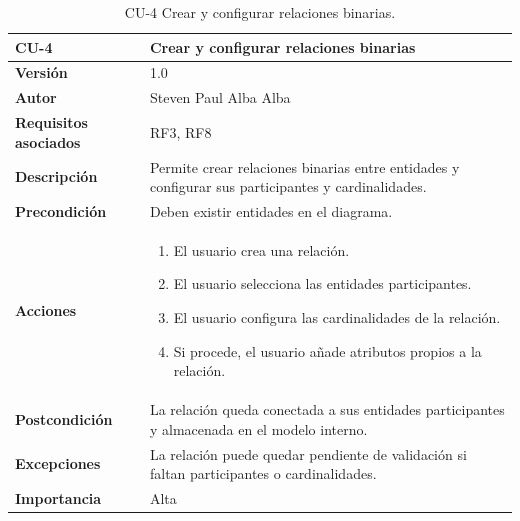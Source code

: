 \begin{table}[p]
\centering
\begin{tabularx}{\linewidth}{ p{} p{} }
\toprule
\textbf{CU-4} & \textbf{Crear y configurar relaciones binarias}\\
\toprule
\textbf{Versión} & 1.0 \\
\textbf{Autor} & Steven Paul Alba Alba \\
\textbf{Requisitos asociados} & RF3, RF8 \\
\textbf{Descripción} & Permite crear relaciones binarias entre entidades y configurar sus participantes y cardinalidades. \\
\textbf{Precondición} & Deben existir entidades en el diagrama. \\
\textbf{Acciones} &
\begin{enumerate}
\def\labelenumi{\arabic{enumi}.}
\tightlist
\item El usuario crea una relación.
\item El usuario selecciona las entidades participantes.
\item El usuario configura las cardinalidades de la relación.
\item Si procede, el usuario añade atributos propios a la relación.
\end{enumerate}\\
\textbf{Postcondición} & La relación queda conectada a sus entidades participantes y almacenada en el modelo interno. \\
\textbf{Excepciones} & La relación puede quedar pendiente de validación si faltan participantes o cardinalidades. \\
\textbf{Importancia} & Alta \\
\bottomrule
\end{tabularx}
\caption{CU-4 Crear y configurar relaciones binarias.}
\end{table}

